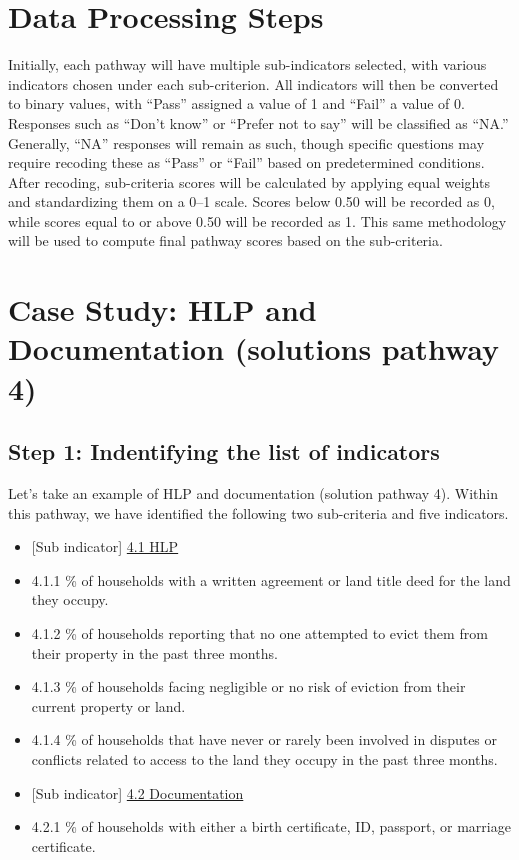 \documentclass[
]{report}
\begin{document}
\section{Data Processing Steps}\label{data-processing-steps}

Initially, each pathway will have multiple sub-indicators selected, with
various indicators chosen under each sub-criterion. All indicators will
then be converted to binary values, with ``Pass'' assigned a value of 1
and ``Fail'' a value of 0. Responses such as ``Don't know'' or ``Prefer
not to say'' will be classified as ``NA.'' Generally, ``NA'' responses
will remain as such, though specific questions may require recoding
these as ``Pass'' or ``Fail'' based on predetermined conditions. After
recoding, sub-criteria scores will be calculated by applying equal
weights and standardizing them on a 0--1 scale. Scores below 0.50 will
be recorded as 0, while scores equal to or above 0.50 will be recorded
as 1. This same methodology will be used to compute final pathway scores
based on the sub-criteria.

\section{Case Study: HLP and Documentation (solutions pathway
4)}\label{case-study-hlp-and-documentation-solutions-pathway-4}

\subsection{Step 1: Indentifying the list of
indicators}\label{step-1-indentifying-the-list-of-indicators}

Let's take an example of HLP and documentation (solution pathway 4).
Within this pathway, we have identified the following two sub-criteria
and five indicators.

\begin{itemize}
\item
  {[}Sub indicator{]} \ul{4.1 HLP}
\item
  4.1.1 \% of households with a written agreement or land title deed for
  the land they occupy.
\item
  4.1.2 \% of households reporting that no one attempted to evict them
  from their property in the past three months.
\item
  4.1.3 \% of households facing negligible or no risk of eviction from
  their current property or land.
\item
  4.1.4 \% of households that have never or rarely been involved in
  disputes or conflicts related to access to the land they occupy in the
  past three months.
\item
  {[}Sub indicator{]} \ul{4.2 Documentation}
\item
  4.2.1 \% of households with either a birth certificate, ID, passport,
  or marriage certificate.
\end{itemize}
\end{document}
